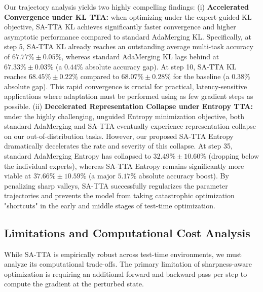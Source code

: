 \documentclass{article}
\theoremstyle{plain}
\theoremstyle{definition}
\theoremstyle{remark}
\begin{document}
Our trajectory analysis yields two highly compelling findings: (i) \textbf{Accelerated Convergence under KL TTA:} when optimizing under the expert-guided KL objective, SA-TTA KL achieves significantly faster convergence and higher asymptotic performance compared to standard AdaMerging KL. Specifically, at step 5, SA-TTA KL already reaches an outstanding average multi-task accuracy of $67.77\% \pm 0.05\%$, whereas standard AdaMerging KL lags behind at $67.33\% \pm 0.03\%$ (a $0.44\%$ absolute accuracy gap). At step 10, SA-TTA KL reaches $68.45\% \pm 0.22\%$ compared to $68.07\% \pm 0.28\%$ for the baseline (a $0.38\%$ absolute gap). This rapid convergence is crucial for practical, latency-sensitive applications where adaptation must be performed using as few gradient steps as possible. (ii) \textbf{Decelerated Representation Collapse under Entropy TTA:} under the highly challenging, unguided Entropy minimization objective, both standard AdaMerging and SA-TTA eventually experience representation collapse on our out-of-distribution tasks. However, our proposed SA-TTA Entropy dramatically decelerates the rate and severity of this collapse. At step 35, standard AdaMerging Entropy has collapsed to $32.49\% \pm 10.60\%$ (dropping below the individual experts), whereas SA-TTA Entropy remains significantly more viable at $37.66\% \pm 10.59\%$ (a major $5.17\%$ absolute accuracy boost). By penalizing sharp valleys, SA-TTA successfully regularizes the parameter trajectories and prevents the model from taking catastrophic optimization "shortcuts" in the early and middle stages of test-time optimization.

\subsection{Limitations and Computational Cost Analysis}
While SA-TTA is empirically robust across test-time environments, we must analyze its computational trade-offs. The primary limitation of sharpness-aware optimization is requiring an additional forward and backward pass per step to compute the gradient at the perturbed state.
\end{document}
